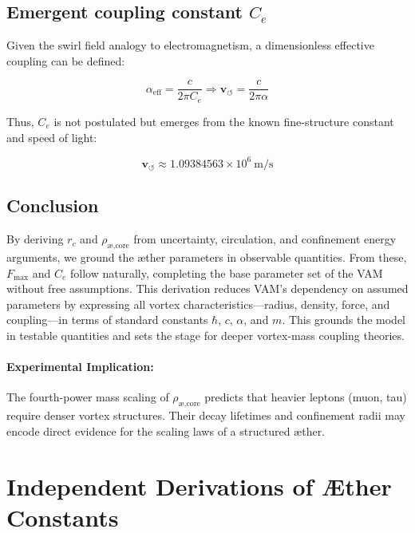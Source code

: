\documentclass[a4paper,12pt]{article}
\begin{document}
        \subsection{Emergent coupling constant \texorpdfstring{$C_e$}{Ce}}
        Given the swirl field analogy to electromagnetism, a dimensionless effective coupling can be defined:

        \begin{equation}
        \alpha_\text{eff} = \frac{c}{2\pi C_e} \Rightarrow \mathbf{v}_{\scriptscriptstyle\boldsymbol{\circlearrowleft}} = \frac{c}{2\pi \alpha}
        \end{equation}

        Thus, $C_e$ is not postulated but emerges from the known fine-structure constant and speed of light:

        \begin{equation}
        \mathbf{v}_{\scriptscriptstyle\boldsymbol{\circlearrowleft}} \approx 1.09384563 \times 10^6 \ \text{m/s}
        \end{equation}


        \subsection{Conclusion}

        By deriving $r_c$ and $\rho_{\text{\ae,core}}$ from uncertainty, circulation, and confinement energy arguments, we ground the \ae{}ther parameters in observable quantities. From these, $F_{\max}$ and $C_e$ follow naturally, completing the base parameter set of the VAM without free assumptions. This derivation reduces VAM's dependency on assumed parameters by expressing all vortex characteristics—radius, density, force, and coupling—in terms of standard constants \(\hbar\), \(c\), \(\alpha\), and \(m\). This grounds the model in testable quantities and sets the stage for deeper vortex-mass coupling theories.

        \paragraph{Experimental Implication:} The fourth-power mass scaling of $\rho_{\text{\ae,core}}$ predicts that heavier leptons (muon, tau) require denser vortex structures. Their decay lifetimes and confinement radii may encode direct evidence for the scaling laws of a structured \ae{}ther.




\section{Independent Derivations of Æther Constants}
\end{document}
